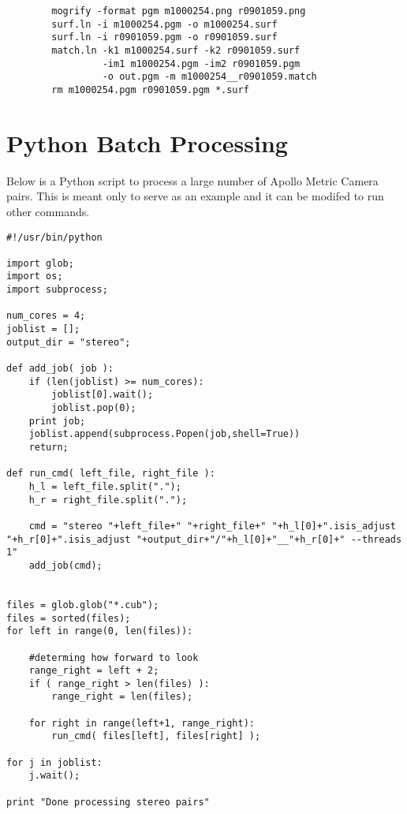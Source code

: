 \begin{verbatim}
        mogrify -format pgm m1000254.png r0901059.png
        surf.ln -i m1000254.pgm -o m1000254.surf
        surf.ln -i r0901059.pgm -o r0901059.surf
        match.ln -k1 m1000254.surf -k2 r0901059.surf
                 -im1 m1000254.pgm -im2 r0901059.pgm
                 -o out.pgm -m m1000254__r0901059.match
        rm m1000254.pgm r0901059.pgm *.surf
\end{verbatim}

\begin{center}
\end{center}


\chapter{Python Batch Processing}

Below is a Python script to process a large number of Apollo Metric
Camera pairs. This is meant only to serve as an example and it can be
modifed to run other commands.

\begin{verbatim}
#!/usr/bin/python

import glob;
import os;
import subprocess;

num_cores = 4;
joblist = [];
output_dir = "stereo";

def add_job( job ):
    if (len(joblist) >= num_cores):
        joblist[0].wait();
        joblist.pop(0);
    print job;
    joblist.append(subprocess.Popen(job,shell=True))
    return;

def run_cmd( left_file, right_file ):
    h_l = left_file.split(".");
    h_r = right_file.split(".");

    cmd = "stereo "+left_file+" "+right_file+" "+h_l[0]+".isis_adjust "+h_r[0]+".isis_adjust "+output_dir+"/"+h_l[0]+"__"+h_r[0]+" --threads 1"
    add_job(cmd);


files = glob.glob("*.cub");
files = sorted(files);
for left in range(0, len(files)):

    #determing how forward to look
    range_right = left + 2;
    if ( range_right > len(files) ):
        range_right = len(files);

    for right in range(left+1, range_right):
        run_cmd( files[left], files[right] );

for j in joblist:
    j.wait();

print "Done processing stereo pairs"

\end{verbatim}
